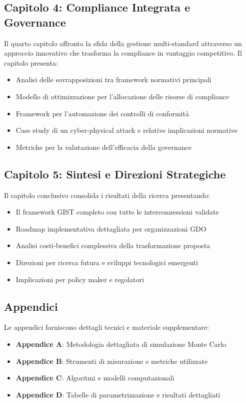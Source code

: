 \subsection{Capitolo 4: Compliance Integrata e Governance}

Il quarto capitolo affronta la sfida della gestione multi-standard attraverso un approccio innovativo che trasforma la compliance in vantaggio competitivo. Il capitolo presenta:
\begin{itemize}
\item Analisi delle sovrapposizioni tra framework normativi principali
\item Modello di ottimizzazione per l'allocazione delle risorse di compliance
\item Framework per l'automazione dei controlli di conformità
\item Case study di un cyber-physical attack e relative implicazioni normative
\item Metriche per la valutazione dell'efficacia della governance
\end{itemize}

\subsection{Capitolo 5: Sintesi e Direzioni Strategiche}

Il capitolo conclusivo consolida i risultati della ricerca presentando:
\begin{itemize}
\item Il framework GIST completo con tutte le interconnessioni validate
\item Roadmap implementativa dettagliata per organizzazioni GDO
\item Analisi costi-benefici complessiva della trasformazione proposta
\item Direzioni per ricerca futura e sviluppi tecnologici emergenti
\item Implicazioni per policy maker e regolatori
\end{itemize}

\subsection{Appendici}

Le appendici forniscono dettagli tecnici e materiale supplementare:
\begin{itemize}
\item \textbf{Appendice A}: Metodologia dettagliata di simulazione Monte Carlo
\item \textbf{Appendice B}: Strumenti di misurazione e metriche utilizzate
\item \textbf{Appendice C}: Algoritmi e modelli computazionali
\item \textbf{Appendice D}: Tabelle di parametrizzazione e risultati dettagliati
\end{itemize}


